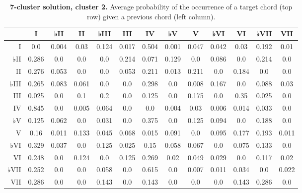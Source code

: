 \begin{table}[htbp]
\begin{minipage}{\linewidth}
\setlength{\tymax}{0.5\linewidth}
\centering
\small
\caption{\textbf{7-cluster solution, cluster 2.} Average probability of the occurrence of a target chord (top row) given a previous chord (left column).}
\label{7-clustersolutioncluster2.averageprobabilityoftheoccurrenceofatargetchordtoprowgivenapreviouschordleftcolumn.}
\begin{tabulary}{\textwidth}{@{}RCCCCCCCCCCCC@{}} \toprule
&I&♭II&II&♭III&III&IV&♭V&V&♭VI&VI&♭VII&VII\\
\midrule
I&0.0&0.004&0.03&0.124&0.017&0.504&0.001&0.047&0.042&0.03&0.192&0.01\\
♭II&0.286&0.0&0.0&0.0&0.214&0.071&0.129&0.0&0.086&0.0&0.214&0.0\\
II&0.276&0.053&0.0&0.0&0.053&0.211&0.013&0.211&0.0&0.184&0.0&0.0\\
♭III&0.265&0.083&0.061&0.0&0.0&0.298&0.0&0.008&0.167&0.0&0.088&0.03\\
III&0.025&0.0&0.1&0.2&0.0&0.125&0.0&0.175&0.0&0.35&0.025&0.0\\
IV&0.845&0.0&0.005&0.064&0.0&0.0&0.004&0.03&0.006&0.014&0.033&0.0\\
♭V&0.125&0.062&0.0&0.031&0.0&0.375&0.0&0.125&0.094&0.0&0.188&0.0\\
V&0.16&0.011&0.133&0.045&0.068&0.015&0.091&0.0&0.095&0.177&0.193&0.011\\
♭VI&0.329&0.037&0.0&0.125&0.025&0.15&0.058&0.067&0.0&0.075&0.133&0.0\\
VI&0.248&0.0&0.124&0.0&0.125&0.269&0.02&0.049&0.029&0.0&0.117&0.02\\
♭VII&0.252&0.0&0.0&0.058&0.0&0.615&0.0&0.007&0.011&0.034&0.0&0.022\\
VII&0.286&0.0&0.0&0.143&0.0&0.143&0.0&0.0&0.0&0.143&0.286&0.0\\

\bottomrule

\end{tabulary}
\end{minipage}
\end{table}

